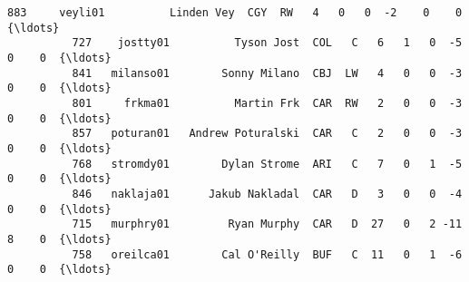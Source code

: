 \documentclass[11pt]{article}
\begin{document}
\begin{Verbatim}[commandchars=\\\{\}]
          883     veyli01          Linden Vey  CGY  RW   4   0   0  -2    0    0  {\ldots}     
          727    jostty01          Tyson Jost  COL   C   6   1   0  -5    0    0  {\ldots}     
          841   milanso01        Sonny Milano  CBJ  LW   4   0   0  -3    0    0  {\ldots}     
          801     frkma01          Martin Frk  CAR  RW   2   0   0  -3    0    0  {\ldots}     
          857   poturan01   Andrew Poturalski  CAR   C   2   0   0  -3    0    0  {\ldots}     
          768   stromdy01        Dylan Strome  ARI   C   7   0   1  -5    0    0  {\ldots}     
          846   naklaja01      Jakub Nakladal  CAR   D   3   0   0  -4    0    0  {\ldots}     
          715   murphry01         Ryan Murphy  CAR   D  27   0   2 -11    8    0  {\ldots}     
          758   oreilca01        Cal O'Reilly  BUF   C  11   0   1  -6    0    0  {\ldots}     
          

\end{Verbatim}
\end{document}

